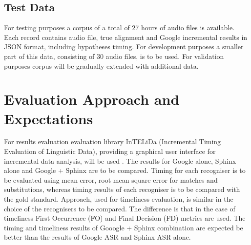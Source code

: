 \subsection {Test Data} 
For testing purposes  a corpus of  a total of 27 hours of audio files  is
available.  Each record contains audio file, true alignment and Google
incremental results in JSON format, including hypotheses timing.  For
development purposes a smaller part of this data, consisting of 30 audio files, is to be used. For validation purposes corpus will be
gradually extended with additional data. 
\section {Evaluation Approach and Expectations}
For results evaluation evaluation library InTELiDa (Incremental Timing
Evaluation of Linguistic Data), providing a graphical user interface for
incremental data analysis, will be used \parencite {baumann2013:phd}. 
The results for Google alone, Sphinx alone and Google + Sphinx are to be
compared. Timing for each recogniser is to be evaluated using mean error, root
mean square error for matches and substitutions, whereas timing results of
each recogniser is to be compared with the gold standard. 
Approach, used for timeliness evaluation, is similar in the choice of the
recognisers to be compared. The difference is that in the case of
timeliness First Occurrence (FO) and Final Decision (FD) metrics are used. 
The  timing and timeliness results of Gooogle + Sphinx combination are
expected be better than the results of Google ASR and Sphinx ASR alone.



